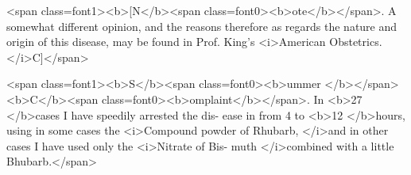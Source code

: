 <span class=font1><b>[N</b><span class=font0><b>ote</b></span>. A somewhat different opinion, and the reasons therefore as
regards the nature and origin of this disease, may be found in Prof.
King's <i>American Obstetrics. </i>C]</span>

<span class=font1><b>S</b><span class=font0><b>ummer </b></span><b>C</b><span class=font0><b>omplaint</b></span>. In <b>27 </b>cases I have speedily arrested the dis-
ease in from 4 to <b>12 </b>hours, using in some cases the <i>Compound powder
of Rhubarb, </i>and in other cases I have used only the <i>Nitrate of Bis-
muth </i>combined with a little Bhubarb.</span>\endinput
